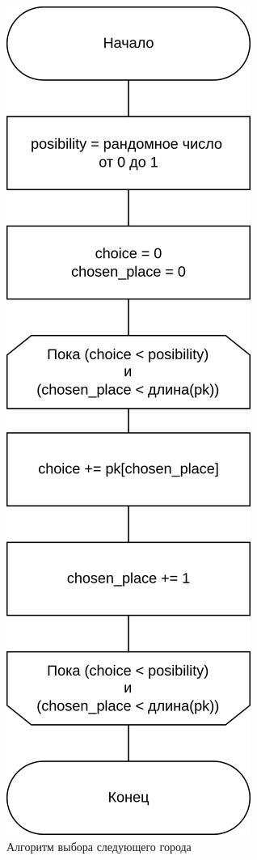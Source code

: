 \begin{figure}[h]
	\centering
	\includegraphics[height=0.7\textheight]{imgs/ant_choose.drawio}
	\caption{Алгоритм выбора следующего города}
	\label{fig:choose}
\end{figure}
